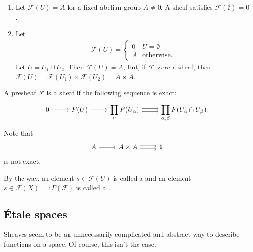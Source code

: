 \documentclass [11 pt, oneside] {article}
\begin{document}
\begin{example}\label{}\text{}
\begin{enumerate}
	\item Let $\mathscr{F}(U) = A$ for a fixed abelian group $A\ne 0$. A sheaf satisfies $\mathscr{F}(\emptyset) = 0$.
	\item Let
		\begin{align*}
			\mathscr{F}(U) = 
			 \begin{cases}
				 0&U=\emptyset\\
				 A&\textrm{otherwise.}
			\end{cases}
		\end{align*}
		Let $U = U_1\sqcup U_2$. Then $\mathscr{F}(U) =A$, but, if $\mathscr{F}$ were a sheaf, then $\mathscr{F}(U) =  \mathscr{F}(U_1)\times \mathscr{F}(U_2) = A\times A$.
\end{enumerate}

A presheaf $\mathscr{F}$ is a sheaf if the following sequence is exact:
\[
\begin{tikzcd}
	0 \ar[r] & \mathscr{F}(U) \ar[r] & \displaystyle\prod_\alpha  \mathscr{F}(U_\alpha) \ar[r, yshift = 0.5 ex] \ar[r, yshift = -0.5 ex] & \displaystyle\prod_{\alpha,\beta}  \mathscr{F}(U_\alpha\cap U_\beta).
\end{tikzcd}
\]
Note that 
\[
\begin{tikzcd}
	A\ar[r] &A\times A \ar[r, yshift = 0.5 ex] \ar[r, yshift = -0.5 ex] & 0 
\end{tikzcd}
\]
is not exact.
\end{example}

By the way, an element $s\in \mathscr{F}(U)$ is called a  and an element $s\in \mathscr{F}(X)=: \Gamma(\mathscr{F})$ is called a .

\subsection{\'Etale spaces}
Sheaves seem to be an unnecessarily complicated and abstract way to describe functions on a space. Of course, this isn't the case.
\end{document}
